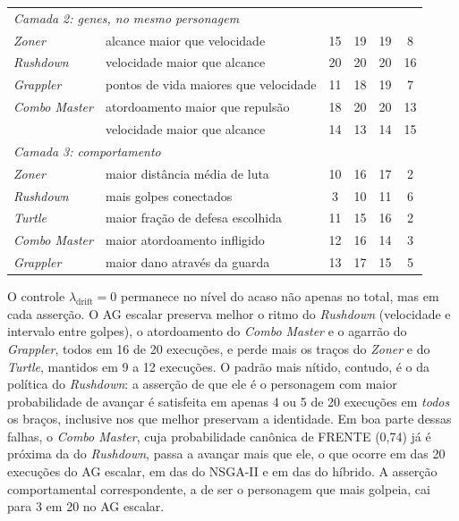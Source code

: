 \begin{table}[htbp]
\begin{tabularx}{\textwidth}{l X c c c c}
        \midrule
        \multicolumn{6}{l}{\textit{Camada 2: genes, no mesmo personagem}} \\
        \textit{Zoner}        & alcance maior que velocidade         & 15 & 19 & 19 & 8 \\
        \textit{Rushdown}     & velocidade maior que alcance         & 20 & 20 & 20 & 16 \\
        \textit{Grappler}     & pontos de vida maiores que velocidade & 11 & 18 & 19 & 7 \\
        \textit{Combo Master} & atordoamento maior que repulsão      & 18 & 20 & 20 & 13 \\
                              & velocidade maior que alcance         & 14 & 13 & 14 & 15 \\
        \midrule
        \multicolumn{6}{l}{\textit{Camada 3: comportamento}} \\
        \textit{Zoner}        & maior distância média de luta        & 10 & 16 & 17 & 2 \\
        \textit{Rushdown}     & mais golpes conectados               & 3  & 10 & 11 & 6 \\
        \textit{Turtle}       & maior fração de defesa escolhida     & 11 & 15 & 16 & 2 \\
        \textit{Combo Master} & maior atordoamento infligido         & 12 & 16 & 14 & 3 \\
        \textit{Grappler}     & maior dano através da guarda         & 13 & 17 & 15 & 5 \\
        \bottomrule
    \end{tabularx}
    \source
\end{table}

O controle $\lambda_{\mathrm{drift}} = 0$ permanece no nível do acaso não apenas no total, mas em cada asserção. O AG escalar preserva melhor o ritmo do \textit{Rushdown} (velocidade e intervalo entre golpes), o atordoamento do \textit{Combo Master} e o agarrão do \textit{Grappler}, todos em 16 de 20 execuções, e perde mais os traços do \textit{Zoner} e do \textit{Turtle}, mantidos em 9 a 12 execuções. O padrão mais nítido, contudo, é o da política do \textit{Rushdown}: a asserção de que ele é o personagem com maior probabilidade de avançar é satisfeita em apenas 4 ou 5 de 20 execuções em \textit{todos} os braços, inclusive nos que melhor preservam a identidade. Em boa parte dessas falhas, o \textit{Combo Master}, cuja probabilidade canônica de FRENTE (0,74) já é próxima da do \textit{Rushdown}, passa a avançar mais que ele, o que ocorre em \cmAvancaMaisAG{} das 20 execuções do AG escalar, em \cmAvancaMaisNSGA{} das do NSGA-II e em \cmAvancaMaisHib{} das do híbrido. A asserção comportamental correspondente, a de ser o personagem que mais golpeia, cai para 3 em 20 no AG escalar.

